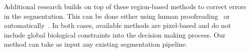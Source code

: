 Additional research builds on top of these region-based methods to correct errors in the segmentation. This can be done either using human proofreading~\cite{haehn2017guided,haehn2014design,mojo2} or automatically~\cite{rolnick2017morphological,error_correction_using_CNN}. 
In both cases, available methods are pixel-based and do not include global biological constraints into the decision making process. 
Our method can take as input any existing segmentation pipeline.

